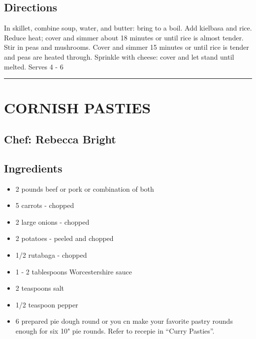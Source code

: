 \documentclass[
]{book}
\providecommand{\tightlist}{%
  \setlength{\itemsep}{0pt}\setlength{\parskip}{0pt}}
\begin{document}
\hypertarget{directions-51}{%
\subsection*{Directions}\label{directions-51}}


In skillet, combine soup, water, and butter: bring to a boil. Add kielbasa and rice. Reduce heat;
cover and simmer about 18 minutes or until rice is almost tender. Stir in peas and mushrooms.
Cover and simmer 15 minutes or until rice is tender and peas are heated through. Sprinkle with cheese:
cover and let stand until melted. Serves 4 - 6

\begin{center}\rule{0.5\linewidth}{0.5pt}\end{center}

\hypertarget{cornish-pasties}{%
\section*{CORNISH PASTIES}\label{cornish-pasties}}


\hypertarget{chef-rebecca-bright}{%
\subsection*{Chef: Rebecca Bright}\label{chef-rebecca-bright}}


\hypertarget{ingredients-52}{%
\subsection*{Ingredients}\label{ingredients-52}}


\begin{itemize}
\tightlist
\item
  2 pounds beef or pork or combination of both
\item
  5 carrots - chopped
\item
  2 large onions - chopped
\item
  2 potatoes - peeled and chopped
\item
  1/2 rutabaga - chopped
\item
  1 - 2 tablespoons Worcestershire sauce
\item
  2 teaspoons salt
\item
  1/2 teaspoon pepper
\item
  6 prepared pie dough round or you cn make your favorite pastry rounds enough for six 10" pie rounds. Refer to recepie in ``Curry Pasties''.
\end{itemize}
\end{document}
